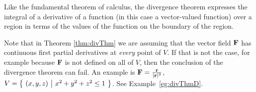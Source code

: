 \noindent
Like the fundamental theorem of calculus, the divergence theorem expresses 
the integral of a derivative of a function (in this case a vector-valued
function) over a region in terms of the values of the function on the boundary of the region.

\begin{warning}\label{warn:divThm}
Note that in Theorem \ref{thm:divThm} we are assuming that
the vector field $\mathbf{F}$ has continuous first partial derivatives 
at \emph{every} point of $V$.
If that is not the case, for example
because $\mathbf{F}$ is not defined on all of $V$, then 
the conclusion of the divergence theorem can fail. An example is
$\mathbf{F} = \frac{\mathbf{r}}{|\mathbf{r}|^3}$, $V=\big\{ \ (x,y,z)\ \big|\ x^2+y^2+z^2\le 1\ \big\}$.
See Example~\ref{eg:divThmD}.
\end{warning}

